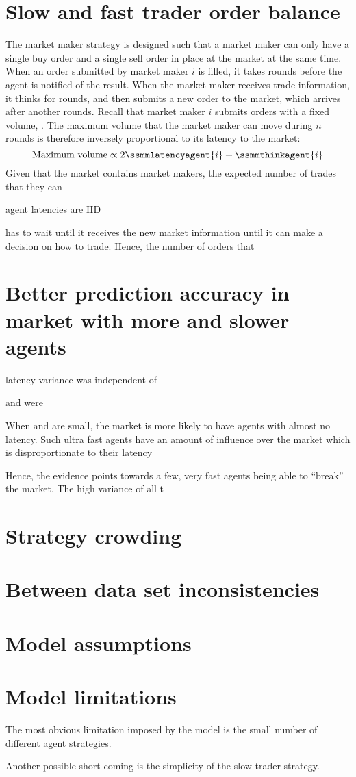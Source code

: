 \section{Slow and fast trader order balance}
The market maker strategy is designed such that a market maker can only have a single buy order and a single sell order in place at the market at the same time. When an order submitted by market maker $i$ is filled, it takes  rounds before the agent is notified of the result. When the market maker receives trade information, it thinks for  rounds, and then submits a new order to the market, which arrives after another  rounds. Recall that market maker $i$ submits orders with a fixed volume, . The maximum volume that the market maker can move during $n$ rounds is therefore inversely proportional to its latency to the market:
\[\text{Maximum volume} \propto 2\ssmmlatencyagent{i} + \ssmmthinkagent{i}\]
Given that the market contains \ssmmnAgents market makers, the expected number of trades that they can 

agent latencies are IID

has to wait until it receives the new market information until it can make a decision on how to trade. Hence, the number of orders that 

\section{Better prediction accuracy in market with more and slower agents}
latency variance was independent of 

\ssmmlatencys and \sclatencys were 

When \ssmmlatencymu{} and \sclatencymu{} are small, the market is more likely to have agents with almost no latency. Such ultra fast agents have an amount of influence over the market which is disproportionate to their latency


Hence, the evidence points towards a few, very fast agents being able to ``break'' the market.
The high variance of all t


\section{Strategy crowding}

\section{Between data set inconsistencies}

\section{Model assumptions}

\section{Model limitations}
The most obvious limitation imposed by the model is the small number of different agent strategies.

Another possible short-coming is the simplicity of the slow trader strategy. 